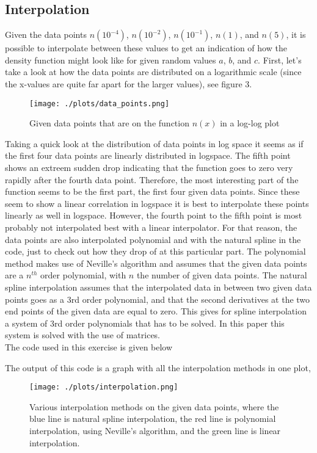 \subsection{Interpolation}
Given the data points $n(10^{-4})$, $n(10^{-2})$, $n(10^{-1})$, $n(1)$, and $n(5)$, it is possible to interpolate between these values to get an indication of how the density function might look like for given random values $a$, $b$, and $c$. First, let's take a look at how the data points are distributed on a logarithmic scale (since the x-values are quite far apart for the larger values), see figure 3.
\begin{figure}[h]
\centering
\texttt{[image: ./plots/data\_points.png]}
\label{data_points}
\caption{Given data points that are on the function $n(x)$ in a log-log plot}
\end{figure}
\newpage
Taking a quick look at the distribution of data points in log space it seems as if the first four data points are linearly distributed in logspace. The fifth point shows an extreem sudden drop indicating that the function goes to zero very rapidly after the fourth data point. Therefore, the most interesting part of the function seems to be the first part, the first four given data points. Since these seem to show a linear correlation in logspace it is best to interpolate these points linearly as well in logspace. However, the fourth point to the fifth point is most probably not interpolated best with a linear interpolator. For that reason, the data points are also interpolated polynomial and with the natural spline in the code, just to check out how they drop of at this particular part. The polynomial method makes use of Neville's algorithm and assumes that the given data points are a $n^{th}$ order polynomial, with $n$ the number of given data points. The natural spline interpolation assumes that the interpolated data in between two given data points goes as a 3rd order polynomial, and that the second derivatives at the two end points of the given data are equal to zero. This gives for spline interpolation a system of 3rd order polynomials that has to be solved. In this paper this system is solved with the use of matrices.\\
The code used in this exercise is given below



The output of this code is a graph with all the interpolation methods in one plot,

\begin{figure}[h]
\centering
\texttt{[image: ./plots/interpolation.png]}
\caption{Various interpolation methods on the given data points, where the blue line is natural spline interpolation, the red line is polynomial interpolation, using Neville's algorithm, and the green line is linear interpolation.}
\end{figure}

